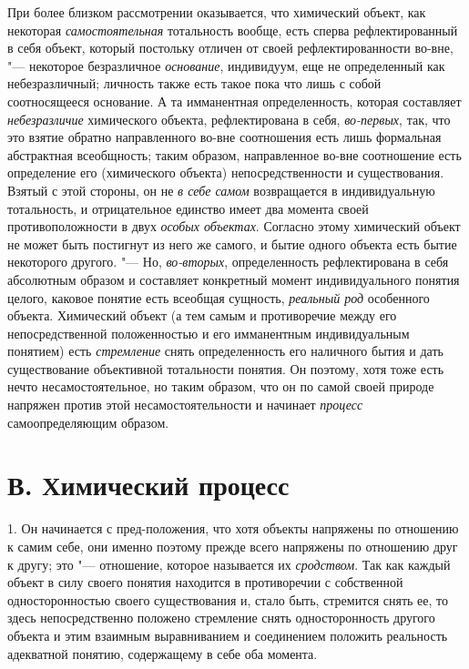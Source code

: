 При более близком рассмотрении оказывается, что химический
объект, как некоторая
{\em самостоятельная}
тотальность вообще, есть сперва рефлектированный в себя
объект, который постольку отличен от своей рефлектированности во-вне, "---
некоторое безразличное
{\em основание},
индивидуум, еще не определенный как небезразличный; личность
также есть такое пока что лишь с собой соотносящееся
основание.
А та имманентная определенность, которая составляет
{\em небезразличие}
химического объекта, рефлектирована в себя,
{\em во-первых}, так, что
это взятие обратно направленного во-вне соотношения есть лишь формальная
абстрактная всеобщность; таким образом, направленное во-вне соотношение
есть определение его (химического объекта) непосредственности и
существования. Взятый с этой стороны, он не
{\em в себе самом}
возвращается в индивидуальную тотальность, и отрицательное
единство имеет два момента своей противоположности в двух
{\em особых объектах}.
Согласно этому химический объект не может быть постигнут из
него же самого, и бытие одного объекта есть бытие некоторого другого. "---
Но, {\em во-вторых},
определенность рефлектирована в себя абсолютным образом и
составляет конкретный момент индивидуального понятия целого, каковое
понятие есть всеобщая сущность,
{\em реальный род}
особенного объекта. Химический объект (а тем самым и
противоречие между его непосредственной положенностью и его имманентным
индивидуальным понятием) есть
{\em стремление} снять
определенность его наличного бытия и дать существование объективной
тотальности понятия. Он поэтому, хотя тоже есть нечто несамостоятельное, но
таким образом, что он по самой своей природе напряжен против этой
несамостоятельности и начинает
{\em процесс}
самоопределяющим образом.

\section[В. Химический процесс]{В. Химический процесс}
1. Он начинается с пред-положения, что хотя объекты напряжены
по отношению к самим себе, они именно поэтому прежде всего напряжены по
отношению друг к другу; это "--- отношение, которое называется
их {\em сродством}. Так
как каждый объект в силу своего понятия находится в противоречии с
собственной односторонностью своего существования и, стало быть, стремится
снять ее, то здесь непосредственно положено стремление снять
односторонность другого объекта и этим взаимным выравниванием и соединением
положить реальность адекватной понятию, содержащему в себе оба момента.


